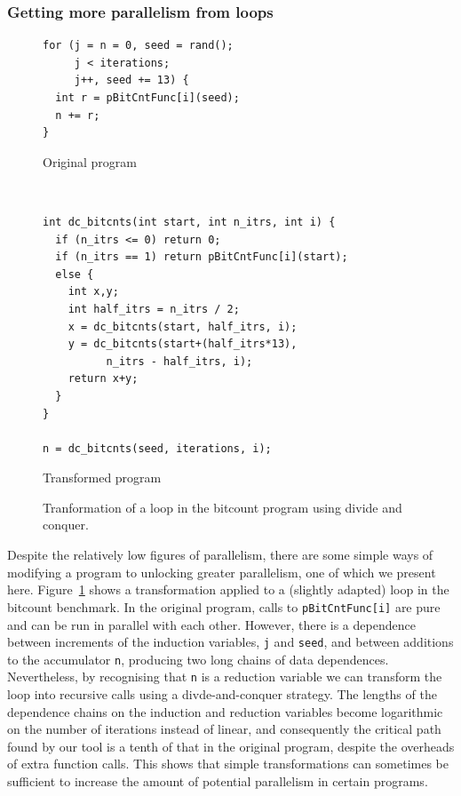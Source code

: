 \subsubsection{Getting more parallelism from loops}

\begin{figure}
  \centering
  \begin{subfloat}
    \begin{minipage}{3in}
      \begin{verbatim}
for (j = n = 0, seed = rand();
     j < iterations;
     j++, seed += 13) {
  int r = pBitCntFunc[i](seed);
  n += r;
}
      \end{verbatim}
    \end{minipage}%
    \label{orig}
    \caption{Original program}
  \end{subfloat}%
\\
  \begin{subfloat}
    \label{dnc-trans}
    \begin{minipage}{3in}
      \begin{verbatim}
int dc_bitcnts(int start, int n_itrs, int i) {
  if (n_itrs <= 0) return 0;
  if (n_itrs == 1) return pBitCntFunc[i](start);
  else {
    int x,y;
    int half_itrs = n_itrs / 2;
    x = dc_bitcnts(start, half_itrs, i);
    y = dc_bitcnts(start+(half_itrs*13),
          n_itrs - half_itrs, i);
    return x+y;
  }
}

n = dc_bitcnts(seed, iterations, i);
      \end{verbatim}
    \end{minipage}%
    \caption{Transformed program}
  \end{subfloat}%
  \caption{Tranformation of a loop in the bitcount program using divide and conquer.}
  \label{dnc}
\end{figure}

Despite the relatively low figures of parallelism, there are some simple ways of modifying a program to unlocking greater parallelism, one of which we present here.
Figure~\ref{dnc} shows a transformation applied to a (slightly adapted) loop in the bitcount benchmark.
In the original program, calls to \texttt{pBitCntFunc[i]} are pure and can be run in parallel with each other.
However, there is a dependence between increments of the induction variables, \texttt{j} and \texttt{seed}, and between additions to the accumulator \texttt{n}, producing two long chains of data dependences.
Nevertheless, by recognising that \texttt{n} is a reduction variable we can transform the loop into recursive calls using a divde-and-conquer strategy.
The lengths of the dependence chains on the induction and reduction variables become logarithmic on the number of iterations instead of linear, and consequently the critical path found by our tool is a tenth of that in the original program, despite the overheads of extra function calls.
This shows that simple transformations can sometimes be sufficient to increase the amount of potential parallelism in certain programs.

